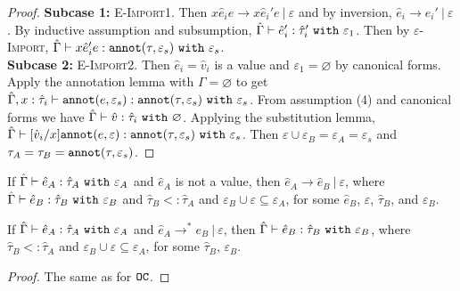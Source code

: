 \begin{appendix}
\begin{proof}
\textbf{Subcase 1:} \textsc{E-Import1}. Then ${x}{\hat e_i}{e} \longrightarrow {x}{\hat e_i'}{e}~|~\varepsilon$ and by inversion, $\hat e_i \longrightarrow \hat e_i'~|~\varepsilon$. By inductive assumption and subsumption, $\hat \Gamma \vdash \hat e_i': \hat \tau_i'~\mathtt{with}~ \varepsilon_1$. Then by \textsc{$\varepsilon$-Import}, $\hat \Gamma \vdash {x}{\hat e_i'}{e}: \mathtt{annot}(\tau, \varepsilon_s)~\mathtt{with}~ \varepsilon_s$. \\

\textbf{Subcase 2:} \textsc{E-Import2}. Then $\hat e_i = \hat v_i$ is a value and $\varepsilon_1 = \varnothing$ by canonical forms. Apply the annotation lemma with $\Gamma = \varnothing$ to get $\hat \Gamma, x: \hat \tau_i \vdash \mathtt{annot}(e, \varepsilon_s): \mathtt{annot}(\tau, \varepsilon_s)~\mathtt{with}~ \varepsilon_s$. From assumption (4) and canonical forms we have $\hat \Gamma \vdash \hat v: \hat \tau_i~\mathtt{with}~ \varnothing$. Applying the substitution lemma, $\hat \Gamma \vdash [\hat v_i/x]\mathtt{annot}(e, \varepsilon): \mathtt{annot}(\tau, \varepsilon_s)~\mathtt{with}~ \varepsilon_s$. Then $\varepsilon \cup \varepsilon_B = \varepsilon_A = \varepsilon_s$ and $\tau_A = \tau_B = \mathtt{annot}(\tau, \varepsilon_s)$.

\end{proof}

\hrulefill

\begin{theorem}
If $\hat \Gamma \vdash \hat e_A: \hat \tau_A~\mathtt{with}~ \varepsilon_A$ and $\hat e_A$ is not a value, then $\hat e_A \longrightarrow \hat e_B~|~\varepsilon$, where $\hat \Gamma \vdash \hat e_B: \hat \tau_B~\mathtt{with}~ \varepsilon_B$ and $\hat \tau_B <: \hat \tau_A$ and $\varepsilon_B \cup \varepsilon \subseteq \varepsilon_A$, for some $\hat e_B$, $\varepsilon$, $\hat \tau_B$, and $\varepsilon_B$.
\end{theorem}


\begin{theorem}
If $\hat \Gamma \vdash \hat e_A: \hat \tau_A~\mathtt{with}~ \varepsilon_A$ and $\hat e_A \longrightarrow^{*} e_B~|~\varepsilon$, then $\hat \Gamma \vdash \hat e_B: \hat \tau_B~\mathtt{with}~ \varepsilon_B$, where $\hat \tau_B <: \hat \tau_A$ and $\varepsilon_B \cup \varepsilon \subseteq \varepsilon_A$, for some $\hat \tau_B$, $\varepsilon_B$.
\end{theorem}


\begin{proof}
The same as for $\mathtt{OC}$.
\end{proof}

\end{appendix}
